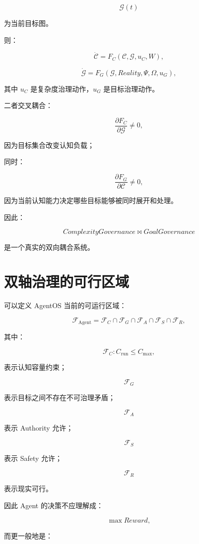 \[
\mathcal G(t)
\]

为当前目标图。

则：

\[
\dot{\mathcal C}
=
F_C(
\mathcal C,
\mathcal G,
u_C,
W
),
\]

\[
\dot{\mathcal G}
=
F_G(
\mathcal G,
Reality,
\Psi,
\Omega,
u_G
),
\]

其中 $u_C$ 是复杂度治理动作，$u_G$ 是目标治理动作。

二者交叉耦合：

\[
\frac{\partial F_C}{\partial \mathcal G}
\neq0,
\]

因为目标集合改变认知负载；

同时：

\[
\frac{\partial F_G}{\partial \mathcal C}
\neq0,
\]

因为当前认知能力决定哪些目标能够被同时展开和处理。

因此：

\[
\boxed{
ComplexityGovernance
\bowtie
GoalGovernance
}
\]

是一个真实的双向耦合系统。


\section{双轴治理的可行区域}

可以定义 AgentOS 当前的可运行区域：

\[
\boxed{
\mathcal F_{\mathrm{Agent}}
=
\mathcal F_C
\cap
\mathcal F_G
\cap
\mathcal F_A
\cap
\mathcal F_S
\cap
\mathcal F_R,
}
\]

其中：

\[
\mathcal F_C:
C_{\mathrm{run}}
\le
C_{\max},
\]

表示认知容量约束；

\[
\mathcal F_G
\]

表示目标之间不存在不可治理矛盾；

\[
\mathcal F_A
\]

表示 Authority 允许；

\[
\mathcal F_S
\]

表示 Safety 允许；

\[
\mathcal F_R
\]

表示现实可行。

因此 Agent 的决策不应理解成：

\[
\max Reward,
\]

而更一般地是：

\begin{statementbox}
\centering
{}
\end{statementbox}

